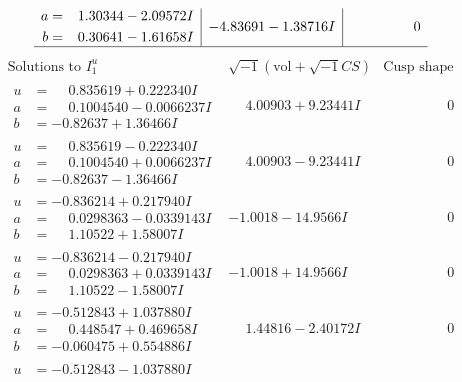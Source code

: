 \documentclass[1p]{elsarticle_modified}
\theoremstyle{definition}
\newcommand{\I}{\sqrt{-1}}
\begin{document}
$$\begin{array}{c|c|c}
\begin{aligned}
a &= \phantom{-}1.30344 - 2.09572 I \\
b &= \phantom{-}0.30641 - 1.61658 I\end{aligned}
 & -4.83691 - 1.38716 I & \phantom{-0.000000 } 0\\
 \hline 
 \end{array}$$\newpage$$\begin{array}{c|c|c}  
\text{Solutions to }I^u_{1}& \I (\text{vol} + \sqrt{-1}CS) & \text{Cusp shape}\\
 \hline 
\begin{aligned}
u &= \phantom{-}0.835619 + 0.222340 I \\
a &= \phantom{-}0.1004540 - 0.0066237 I \\
b &= -0.82637 + 1.36466 I\end{aligned}
 & \phantom{-}4.00903 + 9.23441 I & \phantom{-0.000000 } 0 \\ \hline\begin{aligned}
u &= \phantom{-}0.835619 - 0.222340 I \\
a &= \phantom{-}0.1004540 + 0.0066237 I \\
b &= -0.82637 - 1.36466 I\end{aligned}
 & \phantom{-}4.00903 - 9.23441 I & \phantom{-0.000000 } 0 \\ \hline\begin{aligned}
u &= -0.836214 + 0.217940 I \\
a &= \phantom{-}0.0298363 - 0.0339143 I \\
b &= \phantom{-}1.10522 + 1.58007 I\end{aligned}
 & -1.0018 - 14.9566 I & \phantom{-0.000000 } 0 \\ \hline\begin{aligned}
u &= -0.836214 - 0.217940 I \\
a &= \phantom{-}0.0298363 + 0.0339143 I \\
b &= \phantom{-}1.10522 - 1.58007 I\end{aligned}
 & -1.0018 + 14.9566 I & \phantom{-0.000000 } 0 \\ \hline\begin{aligned}
u &= -0.512843 + 1.037880 I \\
a &= \phantom{-}0.448547 + 0.469658 I \\
b &= -0.060475 + 0.554886 I\end{aligned}
 & \phantom{-}1.44816 - 2.40172 I & \phantom{-0.000000 } 0 \\ \hline\begin{aligned}
u &= -0.512843 - 1.037880 I \\

\end{aligned}
\end{array}$$
\end{document}
